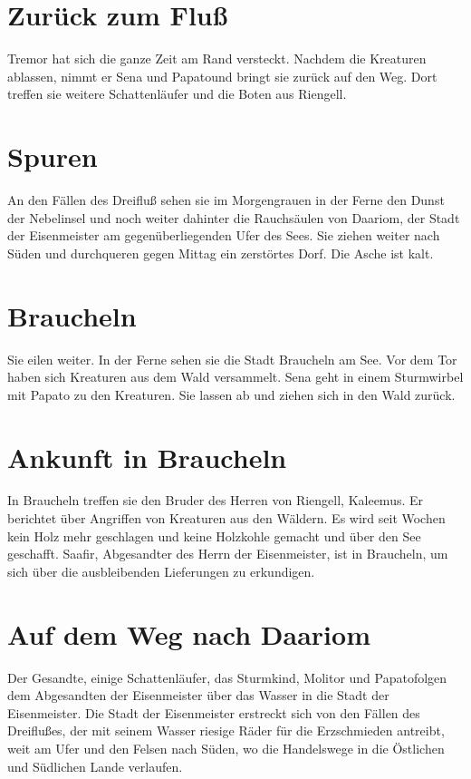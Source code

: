 \documentclass[12pt,a4paper,onecolumn,twoside,ngerman]{book}
\newcommand{\Molitor}{Molitor}
\newcommand{\Sena}{Sena}
\newcommand{\Sturmkind}{Sturmkind}
\newcommand{\Papato}{Papato}
\newcommand{\Schattenlaufer}{Schattenläufer}
\newcommand{\Tremor}{Tremor}
\newcommand{\Rhingell}{Riengell}
\newcommand{\Kalemus}{Kaleemus}
\newcommand{\Dreifluss}{Dreifluß}
\newcommand{\Braucheln}{Braucheln}
\newcommand{\Eisenmeister}{Eisenmeister}
\newcommand{\Dariom}{Daariom}
\newcommand{\Safir}{Saafir}
\begin{document}
{\section{Zurück zum Fluß}
{\Tremor} hat sich die ganze Zeit am Rand versteckt. Nachdem die Kreaturen ablassen, nimmt er {\Sena} und \Papato  und bringt sie zurück auf den Weg. Dort treffen sie weitere {\Schattenlaufer} und die Boten aus {\Rhingell}.

\section{Spuren}
An den Fällen des {\Dreifluss} sehen sie im Morgengrauen in der Ferne den Dunst der Nebelinsel und noch weiter dahinter die Rauchsäulen von {\Dariom}, der Stadt der {\Eisenmeister} am gegenüberliegenden Ufer des Sees.\linebreak
Sie ziehen weiter nach Süden und durchqueren gegen Mittag ein zerstörtes Dorf. Die Asche ist kalt.

\section{\Braucheln}
Sie eilen weiter. In der Ferne sehen sie die Stadt {\Braucheln} am See. Vor dem Tor haben sich Kreaturen aus dem Wald versammelt. {\Sena} geht in einem Sturmwirbel mit {\Papato} zu den Kreaturen. Sie lassen ab und ziehen sich in den Wald zurück.

\section{Ankunft in {\Braucheln}}
In {\Braucheln} treffen sie den Bruder des Herren von {\Rhingell}, {\Kalemus}. Er berichtet über Angriffen von Kreaturen aus den Wäldern. Es wird seit Wochen kein Holz mehr geschlagen und keine Holzkohle gemacht und über den See geschafft. {\Safir}, Abgesandter des Herrn der {\Eisenmeister}, ist in {\Braucheln}, um sich über die ausbleibenden Lieferungen zu erkundigen.

\section{Auf dem Weg nach \Dariom}
Der Gesandte, einige {\Schattenlaufer}, das {\Sturmkind}, {\Molitor} und \Papato folgen dem Abgesandten der {\Eisenmeister} über das Wasser in die Stadt der {\Eisenmeister}.\linebreak
Die Stadt der {\Eisenmeister} erstreckt sich von den Fällen des {\Dreifluss}es, der mit seinem Wasser riesige Räder für die Erzschmieden antreibt, weit am Ufer und den Felsen nach Süden, wo die Handelswege in die Östlichen und Südlichen Lande verlaufen.

}
\end{document}
